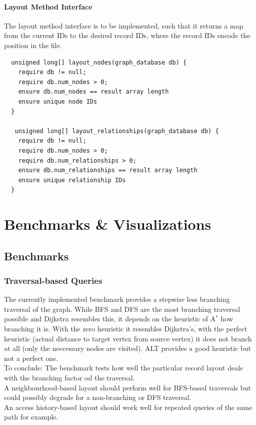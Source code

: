     \paragraph{Layout Method Interface} 
    The layout method interface is to be implemented, such that it returns a map from the current IDs to the desired record IDs, where the record IDs encode the position in the file.
    \begin{verbatim}
  unsigned long[] layout_nodes(graph_database db) {
    require db != null;
    require db.num_nodes > 0;
    ensure db.num_nodes == result array length
    ensure unique node IDs
  }
  
   unsigned long[] layout_relationships(graph_database db) {
    require db != null;
    require db.num_nodes > 0;
    require db.num_relationships > 0;
    ensure db.num_relationships == result array length
    ensure unique relationship IDs
  }

\end{verbatim}


\section{Benchmarks \& Visualizations}

 \subsection{Benchmarks}
    \subsubsection{Traversal-based Queries}
    The currently implemented benchmark provides a stepwise less branching traversal of the graph. While BFS and DFS are the most branching traversal possible and Dijkstra resembles this, it depends on the heuristic of A$^*$ how branching it is. With the zero heuristic it resembles Dijkstra's, with the perfect heuristic (actual distance to target vertex from source vertex) it does not branch at all (only the neccessary nodes are visited). ALT provides a good heuristic but not a perfect one. \\
    To conclude: The benchmark tests how well the particular record layout deals with the branching factor od the traversal. \\
    A neighbourhood-based layout should perform well for BFS-based traversals but could possibly degrade for a non-branching or DFS traversal. \\
    An access history-based layout should work well for repeated queries of the same path for example.
    
